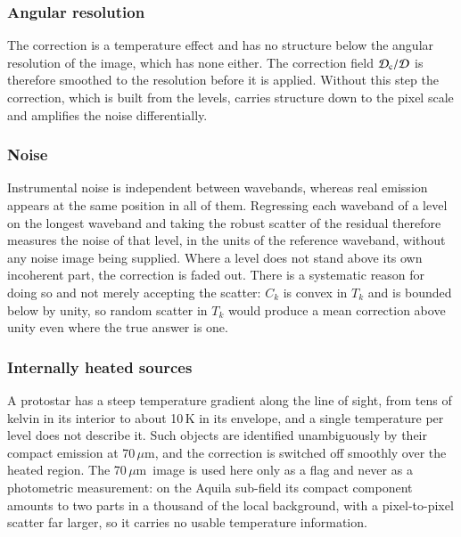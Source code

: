 \documentclass{aa}
\newcommand{\um}{\,$\mu$m}
\newcommand{\Sc}{\mathcal{D}_{\rm c}}
\newcommand{\Sim}{\mathcal{D}}
\begin{document}
\subsubsection{Angular resolution}
\label{sec:resolution}

The correction is a temperature effect and has no structure below the angular
resolution of the image, which has none either. The correction field
$\Sc/\Sim$ is therefore smoothed to the resolution before it is applied.
Without this step the correction, which is built from the levels, carries
structure down to the pixel scale and amplifies the noise differentially.

\subsubsection{Noise}
\label{sec:noise}

Instrumental noise is independent between wavebands, whereas real emission
appears at the same position in all of them. Regressing each waveband of a
level on the longest waveband and taking the robust scatter of the residual
therefore measures the noise of that level, in the units of the reference
waveband, without any noise image being supplied. Where a level does not stand
above its own incoherent part, the correction is faded out. There is a
systematic reason for doing so and not merely accepting the scatter: $C_k$ is
convex in $T_k$ and is bounded below by unity, so random scatter in $T_k$ would
produce a mean correction above unity even where the true answer is one.

\subsubsection{Internally heated sources}
\label{sec:protostars}

A protostar has a steep temperature gradient along the line of sight, from tens
of kelvin in its interior to about 10\,K in its envelope, and a single
temperature per level does not describe it. Such objects are identified
unambiguously by their compact emission at 70\um, and the correction is
switched off smoothly over the heated region. The 70\um\ image is used here
only as a flag and never as a photometric measurement: on the Aquila sub-field
its compact component amounts to two parts in a thousand of the local
background, with a pixel-to-pixel scatter far larger, so it carries no usable
temperature information.

\end{document}
